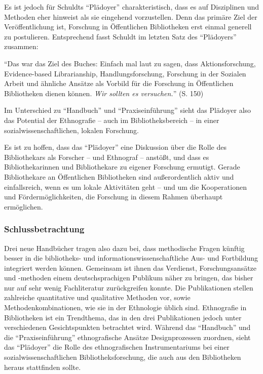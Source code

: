 \documentclass[a4paper,
fontsize=11pt,
oneside,
numbers=noperiodatend,
parskip=half-,
bibliography=totoc,
final
]{scrartcl}
\begin{document}
Es ist jedoch für Schuldts \enquote{Plädoyer} charakteristisch, dass es
auf Disziplinen und Methoden eher hinweist als sie eingehend
vorzustellen. Denn das primäre Ziel der Veröffentlichung ist, Forschung
in Öffentlichen Bibliotheken erst einmal generell zu postulieren.
Entsprechend fasst Schuldt im letzten Satz des \enquote{Plädoyers}
zusammen:

\enquote{Das war das Ziel des Buches: Einfach mal laut zu sagen, dass
Aktionsforschung, Evidence-based Librarianship, Handlungsforschung,
Forschung in der Sozialen Arbeit und ähnliche Ansätze als Vorbild für
die Forschung in Öffentlichen Bibliotheken dienen können. \emph{Wir
sollten es versuchen.}} (S. 150)

Im Unterschied zu \enquote{Handbuch} und \enquote{Praxiseinführung}
sieht das Plädoyer also das Potential der Ethnografie -- auch im
Bibliotheksbereich -- in einer sozialwissenschaftlichen, lokalen
Forschung.

Es ist zu hoffen, dass das \enquote{Plädoyer} eine Diskussion über die
Rolle des Bibliothekars als Forscher -- und Ethnograf -- anstößt, und
dass es Bibliothekarinnen und Bibliothekare zu eigener Forschung
ermutigt. Gerade Bibliothekare an Öffentlichen Bibliotheken sind
außerordentlich aktiv und einfallsreich, wenn es um lokale Aktivitäten
geht -- und um die Kooperationen und Fördermöglichkeiten, die Forschung
in diesem Rahmen überhaupt ermöglichen.

\subsubsection{Schlussbetrachtung}\label{schlussbetrachtung}

Drei neue Handbücher tragen also dazu bei, dass methodische Fragen
künftig besser in die bibliotheks- und informationswissenschaftliche
Aus- und Fortbildung integriert werden können. Gemeinsam ist ihnen das
Verdienst, Forschungsansätze und -methoden einem deutschsprachigen
Publikum näher zu bringen, das bisher nur auf sehr wenig Fachliteratur
zurückgreifen konnte. Die Publikationen stellen zahlreiche quantitative
und qualitative Methoden vor, sowie Methodenkombinationen, wie sie in
der Ethnologie üblich sind. Ethnografie in Bibliotheken ist ein
Trendthema, das in den drei Publikationen jedoch unter verschiedenen
Gesichtspunkten betrachtet wird. Während das \enquote{Handbuch} und die
\enquote{Praxiseinführung} ethnografische Ansätze Designprozessen
zuordnen, sieht das \enquote{Plädoyer} die Rolle des ethnografischen
Instrumentariums bei einer sozialwissenschaftlichen
Bibliotheksforschung, die auch aus den Bibliotheken heraus stattfinden
sollte.
\end{document}

